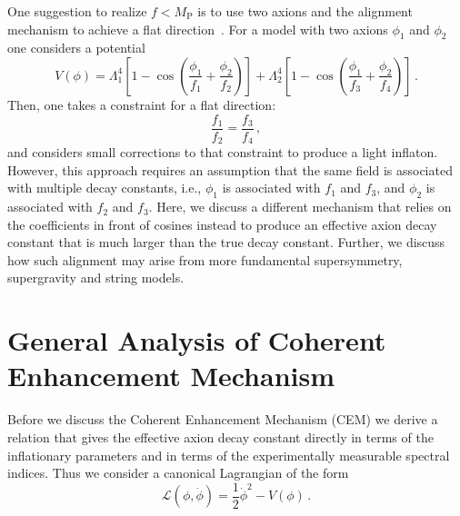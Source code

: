 \documentclass[12pt]{article}
\begin{document}
One suggestion to realize $f < M_\text{P}$ is to use two axions and the alignment mechanism to achieve a flat direction~\cite{Long:2014dta}.
For a model with two axions $\phi_1$ and $\phi_2$ one considers a potential
\begin{equation} \label{eq:alignmentPotential}
  V(\phi)
    = \Lambda^4_1 \left[1 - \cos\left(\frac{\phi_1}{f_1} + \frac{\phi_2}{f_2}\right)\right]
    + \Lambda^4_2 \left[1 - \cos\left(\frac{\phi_1}{f_3} + \frac{\phi_2}{f_4}\right)\right]\,.
\end{equation}
Then, one takes a constraint for a flat direction:
\begin{equation}
  \frac{f_1}{f_2} = \frac{f_3}{f_4}\,,
\end{equation}
and considers small corrections to that constraint to produce a light inflaton.
However, this approach requires an assumption that the same field is associated with multiple decay constants, i.e., $\phi_1$ is associated with $f_1$ and $f_3$, and $\phi_2$ is associated with $f_2$ and $f_3$.
Here, we discuss a different mechanism that relies on the coefficients in front of cosines instead to produce an effective axion decay constant that is much larger than the true decay constant.
Further, we discuss how such alignment may arise from more fundamental supersymmetry, supergravity and string models.

\section{General Analysis of Coherent Enhancement Mechanism \label{sec:CoherentEnhancement}}
Before we discuss the Coherent Enhancement Mechanism (CEM) we derive a relation that gives the effective axion decay constant directly in terms of the inflationary parameters and in terms of the experimentally measurable spectral indices.
Thus we consider a canonical Lagrangian of the form
\begin{equation}
  \mathcal{L}\left(\phi, \dot{\phi}\right) = \frac{1}{2}{\dot{\phi}}^2 - V\left(\phi\right)\,.
\end{equation}
\end{document}
